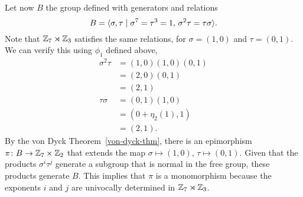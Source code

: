 \begin{xmpl}
    Let now $B$ the group defined with generators and relations
    $$
        B = \langle\sigma,\tau\mid \sigma^7=\tau^3=1,\,\sigma^2\tau=\tau\sigma\rangle.
    $$
    Note that $\mathbb{Z}_7\rtimes\mathbb{Z}_3$ satisfies the same relations, for $\sigma=(1,0)$ and $\tau=(0,1)$. We can verify this using $\phi_1$ defined above,
    \begin{align*}
        \sigma^2\tau &= (1,0)(1,0)(0,1)\\
            &= (2,0)(0,1)\\
            &= (2,1)\\
        \tau\sigma &= (0,1)(1,0)\\
            &= (0+\eta_2(1),1)\\
            &= (2,1).
    \end{align*}
    By the von Dyck Theorem~\ref{von-dyck-thm}, there is an epimorphism $\pi\colon B\to\mathbb{Z}_7\times\mathbb{Z}_2$ that extends the map $\sigma\mapsto(1,0)$, $\tau\mapsto(0,1)$. Given that the products $\sigma^i\tau^j$ generate a subgroup that is normal in the free group, these products generate $B$. This implies that $\pi$ is a monomorphism because the exponents $i$ and $j$ are univocally determined in $\mathbb{Z}_7\rtimes\mathbb{Z}_3$.
\end{xmpl}

